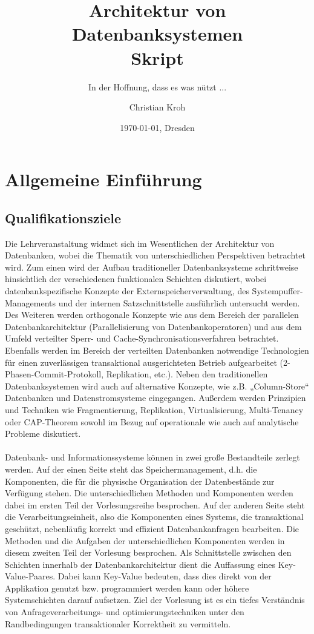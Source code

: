 \documentclass[10pt,german,a4paper]{scrreprt}
\title{Architektur von Datenbanksystemen\\Skript}
\subtitle{In der Hoffnung, dass es was nützt ...}
\author{Christian Kroh}
\date{\today{}, Dresden}
\theoremstyle{mytheoremstyle}
\begin{document}
\maketitle
\newpage
\tableofcontents
\newpage

\chapter{Allgemeine Einführung}
\section{Qualifikationsziele}
Die Lehrveranstaltung widmet sich im Wesentlichen der Architektur von Datenbanken, wobei die Thematik von unterschiedlichen Perspektiven betrachtet wird.  Zum einen wird der Aufbau traditioneller Datenbanksysteme schrittweise hinsichtlich der verschiedenen funktionalen Schichten diskutiert, wobei datenbankspezifische Konzepte der Externspeicherverwaltung, des Systempuffer-Managements und der internen Satzschnittstelle ausführlich untersucht werden.  Des Weiteren werden orthogonale Konzepte wie aus dem Bereich der parallelen Datenbankarchitektur (Parallelisierung von Datenbankoperatoren) und aus dem Umfeld verteilter Sperr- und Cache-Synchronisationsverfahren betrachtet. Ebenfalls werden im Bereich der verteilten Datenbanken notwendige Technologien für einen zuverlässigen transaktional ausgerichteten Betrieb aufgearbeitet (2-Phasen-Commit-Protokoll, Replikation, etc.). Neben den traditionellen Datenbanksystemen wird auch auf alternative Konzepte, wie z.B. „Column-Store“ Datenbanken und Datenstromsysteme eingegangen. Außerdem werden Prinzipien und Techniken wie Fragmentierung, Replikation, Virtualisierung, Multi-Tenancy oder CAP-Theorem sowohl im Bezug auf operationale wie auch auf analytische Probleme diskutiert.\\\\
Datenbank- und Informationssysteme können in zwei große Bestandteile zerlegt werden. Auf der einen Seite steht das Speichermanagement, d.h. die Komponenten, die für die physische Organisation der Datenbestände zur Verfügung stehen. Die unterschiedlichen Methoden und Komponenten werden dabei im ersten Teil der Vorlesungsreihe besprochen. Auf der anderen Seite steht die Verarbeitungseinheit, also die Komponenten eines Systems, die transaktional geschützt, nebenläufig korrekt und effizient Datenbankanfragen bearbeiten. Die Methoden und die Aufgaben der unterschiedlichen Komponenten werden in diesem zweiten Teil der Vorlesung besprochen. Als Schnittstelle zwischen den Schichten innerhalb der Datenbankarchitektur dient die Auffassung eines Key-Value-Paares. Dabei kann Key-Value bedeuten, dass dies direkt von der Applikation genutzt bzw. programmiert werden kann oder höhere Systemschichten darauf aufsetzen. Ziel der Vorlesung ist es ein tiefes Verständnis von Anfrageverarbeitungs- und optimierungstechniken unter den Randbedingungen transaktionaler Korrektheit zu vermitteln.
\end{document}

